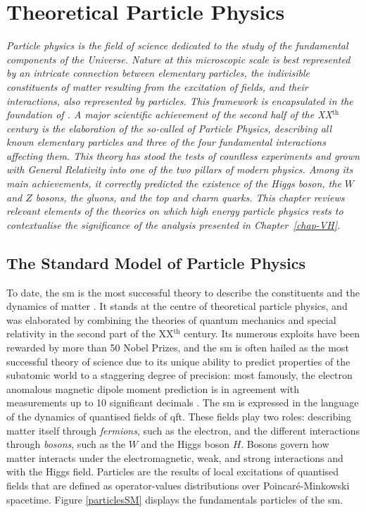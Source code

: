 \chapter{\color{oxfordblue} Theoretical Particle Physics}\label{chap-theory}
\ChapFrame

\textit{Particle physics is the field of science dedicated to the study of the fundamental components of the Universe. Nature at this microscopic scale is best represented by an intricate connection between elementary particles, the indivisible constituents of matter resulting from the excitation of fields, and their interactions, also represented by particles. This framework is encapsulated in the foundation of . A major scientific achievement of the second half of the XX$^{\text{th}}$ century is the elaboration of the so-called  of Particle Physics, describing all known elementary particles and three of the four fundamental interactions affecting them. This theory has stood the tests of countless experiments and grown with General Relativity into one of the two pillars of modern physics. Among its main achievements, it correctly predicted the existence of the Higgs boson, the $W$ and $Z$ bosons, the gluons, and the top and charm quarks. This chapter reviews relevant elements of the theories on which high energy particle physics rests to contextualise the significance of the analysis presented in Chapter~\ref{chap-VH}.}

\section{The Standard Model of Particle Physics}\label{Section:SM}
To date, the \gls{sm} is the most successful theory to describe the constituents and the dynamics of matter \cite{SMphysics}. It stands at the centre of theoretical particle physics, and was elaborated by combining the theories of quantum mechanics and special relativity in the second part of the XX$^{\text{th}}$ century. Its numerous exploits have been rewarded by more than 50 Nobel Prizes, and the \gls{sm} is often hailed as the most successful theory of science due to its unique ability to predict properties of the subatomic world to a staggering degree of precision: most famously, the electron anomalous magnetic dipole moment prediction is in agreement with measurements up to 10 significant decimals \cite{PhysRevA.83.052122}. The \gls{sm} is expressed in the language of the dynamics of quantised fields of \gls{qft}. These fields play two roles: describing matter itself through \textit{fermions}, such as the electron, and the different interactions through \textit{bosons}, such as the $W$ and the Higgs boson $H$. Bosons govern how matter interacts under the electromagnetic, weak, and strong interactions and with the Higgs field. Particles are the results of local excitations of quantised fields that are defined as operator-values distributions over Poincaré-Minkowski spacetime. Figure \ref{particlesSM} displays the fundamentals particles of the \gls{sm}. \\

